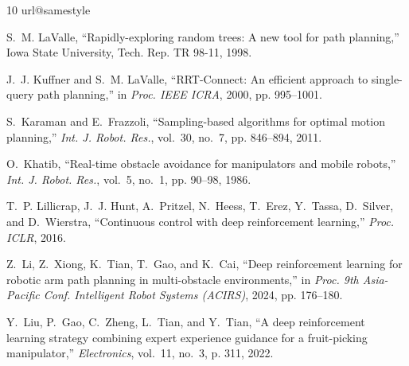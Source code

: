 \documentclass[conference]{IEEEtran}
\begin{document}
\begin{thebibliography}{10}
\providecommand{\url}[1]{#1}
\csname url@samestyle\endcsname
\providecommand{\newblock}{\relax}
\providecommand{\bibinfo}[2]{#2}
\providecommand{\BIBentrySTDinterwordspacing}{\spaceskip=0pt\relax}
\providecommand{\BIBentryALTinterwordstretchfactor}{4}
\providecommand{\BIBentryALTinterwordspacing}{\spaceskip=\fontdimen2\font plus
\BIBentryALTinterwordstretchfactor\fontdimen3\font minus
  \fontdimen4\font\relax}
\providecommand{\BIBforeignlanguage}[2]{{%
\expandafter\ifx\csname l@#1\endcsname\relax
\typeout{** WARNING: IEEEtran.bst: No hyphenation pattern has been}%
\typeout{** loaded for the language `#1'. Using the pattern for}%
\typeout{** the default language instead.}%
\else
\language=\csname l@#1\endcsname
\fi
#2}}
\providecommand{\BIBdecl}{\relax}
\BIBdecl

S.~M. LaValle, ``Rapidly-exploring random trees: A new tool for path
  planning,'' Iowa State University, Tech. Rep. TR 98-11, 1998.

J.~J. Kuffner and S.~M. LaValle, ``{RRT-Connect}: An efficient approach to
  single-query path planning,'' in \emph{Proc. IEEE ICRA}, 2000, pp. 995--1001.

S.~Karaman and E.~Frazzoli, ``Sampling-based algorithms for optimal motion
  planning,'' \emph{Int. J. Robot. Res.}, vol.~30, no.~7, pp. 846--894, 2011.

O.~Khatib, ``Real-time obstacle avoidance for manipulators and mobile robots,''
  \emph{Int. J. Robot. Res.}, vol.~5, no.~1, pp. 90--98, 1986.

T.~P. Lillicrap, J.~J. Hunt, A.~Pritzel, N.~Heess, T.~Erez, Y.~Tassa,
  D.~Silver, and D.~Wierstra, ``Continuous control with deep reinforcement
  learning,'' \emph{Proc. ICLR}, 2016.

Z.~Li, Z.~Xiong, K.~Tian, T.~Gao, and K.~Cai, ``Deep reinforcement learning for
  robotic arm path planning in multi-obstacle environments,'' in \emph{Proc.
  9th Asia-Pacific Conf. Intelligent Robot Systems (ACIRS)}, 2024, pp.
  176--180.

Y.~Liu, P.~Gao, C.~Zheng, L.~Tian, and Y.~Tian, ``A deep reinforcement learning
  strategy combining expert experience guidance for a fruit-picking
  manipulator,'' \emph{Electronics}, vol.~11, no.~3, p. 311, 2022.


\end{thebibliography}
\end{document}
